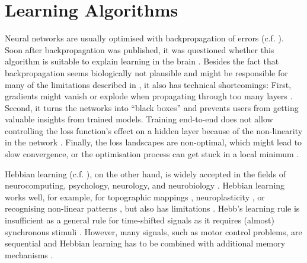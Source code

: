 \section{Learning Algorithms}
Neural networks are usually optimised with backpropagation of errors (c.f. ).
Soon after backpropagation was published, it was questioned whether this algorithm is suitable to explain learning in the brain .
Besides the fact that backpropagation seems biologically not plausible and might be responsible for many of the limitations described in , it also has technical shortcomings:
First, gradients might vanish or explode when propagating through too many layers .
Second, it turns the networks into ``black boxes'' and prevents users from getting valuable insights from trained models.
Training end-to-end does not allow controlling the loss function's effect on a hidden layer because of the non-linearity in the network .
Finally, the loss landscapes are non-optimal, which might lead to slow convergence, or the optimisation process can get stuck in a local minimum  .

Hebbian learning (c.f. ), on the other hand, is widely accepted in the fields of neurocomputing, psychology, neurology, and neurobiology .
Hebbian learning works well, for example, for topographic mappings , neuroplasticity , or recognising non-linear patterns , but also has limitations \cite{Anderson_1998}.
Hebb's learning rule is insufficient as a general rule for time-shifted signals as it requires (almost) synchronous stimuli .
However, many signals, such as motor control problems, are sequential and Hebbian learning has to be combined with additional memory mechanisms .

